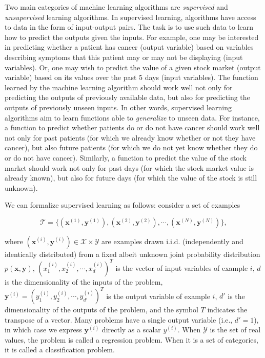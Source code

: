 Two main categories of machine learning algorithms are \textit{supervised} and \textit{unsupervised} learning algorithms. In supervised learning, algorithms have access to data in the form of input-output pairs. The task is to use such data to learn how to predict the outputs given the inputs. For example, one may be interested in predicting whether a patient has cancer (output variable) based on variables describing symptoms that this patient may or may not be displaying (input variables). Or, one may wish to predict the value of a given stock market (output variable) based on its values over the past 5 days (input variables). The function learned by the machine learning algorithm should work well not only for predicting the outputs of previously available data, but also for predicting the outputs of previously unseen inputs. In other words, supervised learning algorithms aim to learn functions able to \textit{generalize} to unseen data. For instance, a function to predict whether patients do or do not have cancer should work well not only for past patients (for which we already know whether or not they have cancer), but also future patients (for which we do not yet know whether they do or do not have cancer). Similarly, a function to predict the value of the stock market should work not only for past days (for which the stock market value is already known), but also for future days (for which the value of the stock is still unknown).

We can formalize supervised learning as follows: consider a set of examples 

\[\mathcal{T} = \{(\mathbf{x}^{(1)},\mathbf{y}^{(1)}),(\mathbf{x}^{(2)},\mathbf{y}^{(2)}),\cdots,(\mathbf{x}^{(N)},\mathbf{y}^{(N)})\},\]

\noindent where $(\mathbf{x}^{(i)},\mathbf{y}^{(i)}) \in \mathcal{X} \times \mathcal{Y}$  are examples drawn i.i.d. (independently and identically distributed) from a fixed albeit unknown joint probability distribution $p(\mathbf{x},\mathbf{y})$, $(x_1^{(i)},x_2^{(i)},\cdots,x_d^{(i)})^T$ is the vector of input variables of example $i$, $d$ is the dimensionality of the inputs of the problem, $\mathbf{y}^{(i)} = (y_1^{(i)}, y_2^{(i)}, \cdots, y_{d'}^{(i)})^T$ is the output variable of example $i$, $d'$ is the dimensionality of the outputs of the problem, and the symbol $T$ indicates the transpose of a vector. Many problems have a single output variable (i.e.,  $d'=1$), in which case we express $\mathbf{y}^{(i)}$ directly as a scalar $y^{(i)}$. When $\mathcal{Y}$ is the set of real values, the problem is called a regression problem. When it is a set of categories, it is called a classification problem. 

